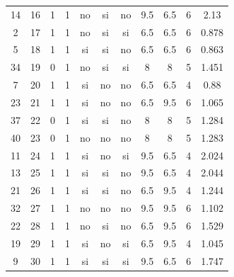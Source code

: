 \documentclass[12pt,a4paper,twoside,openright,titlepage,final]{article}
\begin{document}
\begin{appendices}
\begin{landscape}
\begin{center}
\begin{longtable}{@{\extracolsep{\fill}}*{11}{c}}
							14       & 16           & 1         & 1       & no   & si        & no           & 9.5        & 6.5           & 6             & 2.13   \\
							2        & 17           & 1         & 1       & no   & si        & si           & 6.5        & 6.5           & 6             & 0.878  \\
							5        & 18           & 1         & 1       & si   & si        & no           & 6.5        & 6.5           & 6             & 0.863  \\
							34       & 19           & 0         & 1       & no   & si        & si           & 8          & 8             & 5             & 1.451  \\
							7        & 20           & 1         & 1       & si   & no        & no           & 6.5        & 6.5           & 4             & 0.88   \\
							23       & 21           & 1         & 1       & si   & no        & no           & 6.5        & 9.5           & 6             & 1.065  \\
							37       & 22           & 0         & 1       & si   & si        & no           & 8          & 8             & 5             & 1.284  \\
							40       & 23           & 0         & 1       & no   & no        & no           & 8          & 8             & 5             & 1.283  \\
							11       & 24           & 1         & 1       & si   & no        & si           & 9.5        & 6.5           & 4             & 2.024  \\
							13       & 25           & 1         & 1       & si   & si        & no           & 9.5        & 6.5           & 4             & 2.044  \\
							21       & 26           & 1         & 1       & si   & si        & no           & 6.5        & 9.5           & 4             & 1.244  \\
							32       & 27           & 1         & 1       & no   & no        & no           & 9.5        & 9.5           & 6             & 1.102  \\
							22       & 28           & 1         & 1       & no   & si        & no           & 6.5        & 9.5           & 6             & 1.529  \\
							19       & 29           & 1         & 1       & si   & no        & si           & 6.5        & 9.5           & 4             & 1.045  \\
							9        & 30           & 1         & 1       & si   & si        & si           & 9.5        & 6.5           & 6             & 1.747  \\

\end{longtable}
\end{center}
\end{landscape}
\end{appendices}
\end{document}
